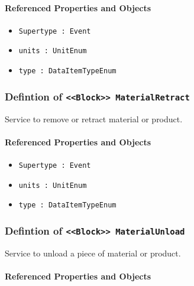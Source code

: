 \FloatBarrier
\paragraph{Referenced Properties and Objects}

\begin{itemize}
\item \texttt{Supertype : Event}

\item \texttt{units : UnitEnum}

\item \texttt{type : DataItemTypeEnum}

\end{itemize}
\FloatBarrier
\subsubsection{Defintion of \texttt{<<Block>> MaterialRetract}}
  \label{type:MaterialRetract}

\FloatBarrier

Service to remove or retract material or product.

\FloatBarrier
\paragraph{Referenced Properties and Objects}

\begin{itemize}
\item \texttt{Supertype : Event}

\item \texttt{units : UnitEnum}

\item \texttt{type : DataItemTypeEnum}

\end{itemize}
\FloatBarrier
\subsubsection{Defintion of \texttt{<<Block>> MaterialUnload}}
  \label{type:MaterialUnload}

\FloatBarrier

Service to unload a piece of material or product.

\FloatBarrier
\paragraph{Referenced Properties and Objects}

